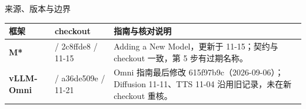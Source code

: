 \begin{frame}[t]{来源、版本与边界}
\scriptsize\def\codesize{\relax}
\renewcommand{\arraystretch}{1.12}
\setlength{\tabcolsep}{3pt}
\begin{tabularx}{\textwidth}{>{\bfseries}p{1.8cm} p{3.4cm} Y}
\toprule
{}
框架 &  checkout & 指南与核对说明 \\
\midrule
M* &  / 2c8ffde8 / 11-15 & Adding a New Model，更新于 11-15；契约与 checkout 一致，第 5 步有过期名称。 \\
vLLM-Omni &  / a36de509e / 11-21 & Omni 指南最后修改 615f97b9c（2026-09-06）；Diffusion 11-11、TTS 11-04 沿用旧记录，未在新 checkout 重核。 \\
\bottomrule
\end{tabularx}
\vspace{2pt}
\end{frame}
